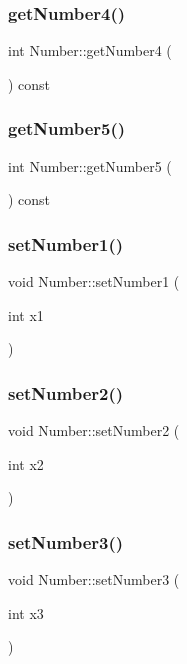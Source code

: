 \mbox{\label{class_number_a11fae54d42e7dfe2f8a5061640bc465b}} 
\subsubsection{getNumber4()}
{\footnotesize\ttfamily int Number\+::get\+Number4 (\begin{DoxyParamCaption}{ }\end{DoxyParamCaption}) const}

\mbox{\label{class_number_aef1458548efdc7ad31d188392c01db24}} 
\subsubsection{getNumber5()}
{\footnotesize\ttfamily int Number\+::get\+Number5 (\begin{DoxyParamCaption}{ }\end{DoxyParamCaption}) const}

\mbox{\label{class_number_a8ef566c0301dbbddea043c5309484c1b}} 
\subsubsection{setNumber1()}
{\footnotesize\ttfamily void Number\+::set\+Number1 (\begin{DoxyParamCaption}\item[{int}]{x1 }\end{DoxyParamCaption})}

\mbox{\label{class_number_a6b37fd9e0ec669665b56d14ce840bd0a}} 
\subsubsection{setNumber2()}
{\footnotesize\ttfamily void Number\+::set\+Number2 (\begin{DoxyParamCaption}\item[{int}]{x2 }\end{DoxyParamCaption})}

\mbox{\label{class_number_aaf03ea2d6cb1895588faf479434eba0c}} 
\subsubsection{setNumber3()}
{\footnotesize\ttfamily void Number\+::set\+Number3 (\begin{DoxyParamCaption}\item[{int}]{x3 }\end{DoxyParamCaption})}

